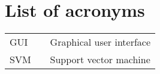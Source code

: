 \chapter*{List of acronyms}

\setlength{\LTleft}{0pt}
\begin{longtable}{lll}
GUI	& \phantom{xxxxxxx} & Graphical user interface\\
SVM	& \phantom{xxxxxxx} & Support vector machine\\
\end{longtable}